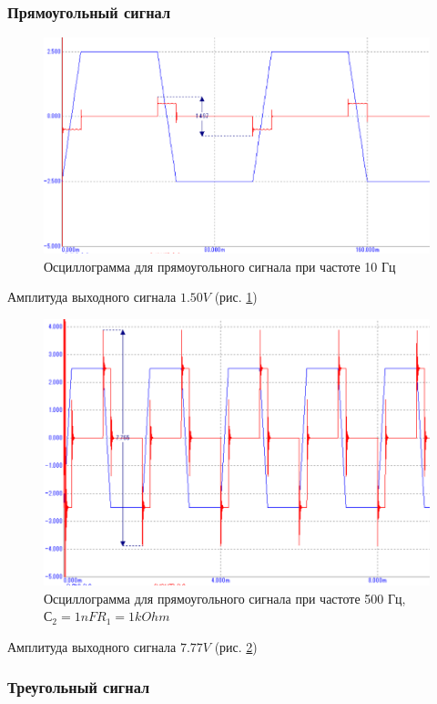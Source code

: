 \documentclass[a4paper,14pt]{article}
\begin{document}
\subsubsection{Прямоугольный сигнал}

\begin{figure}[H]
	\centering
	\includegraphics[width=0.7\linewidth]{../imgs/tran_square_10Hz_diff}
	\caption{Осциллограмма для прямоугольного сигнала при частоте 10 Гц}
	\label{fig:tran_square_10Hz_diff}
\end{figure}

Амплитуда выходного сигнала $1.50V$ (рис. \ref{fig:tran_square_10Hz_diff})

\begin{figure}[H]
	\centering
	\includegraphics[width=0.7\linewidth]{../imgs/tran_square_500Hz_diff}
	\caption{Осциллограмма для прямоугольного сигнала при частоте 500 Гц, $С_2=1nF R_1 = 1kOhm$}
	\label{fig:tran_square_500Hz_diff}
\end{figure}

Амплитуда выходного сигнала $7.77V$ (рис. \ref{fig:tran_square_500Hz_diff})

\subsubsection{Треугольный сигнал}
\end{document}
